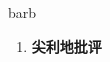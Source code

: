 
\begin{frame}
{\huge barb}
\begin{center}
\begin{enumerate}\Large
  \item \textbf{尖利地批评}
\end{enumerate}
\end{center}
\end{frame}
